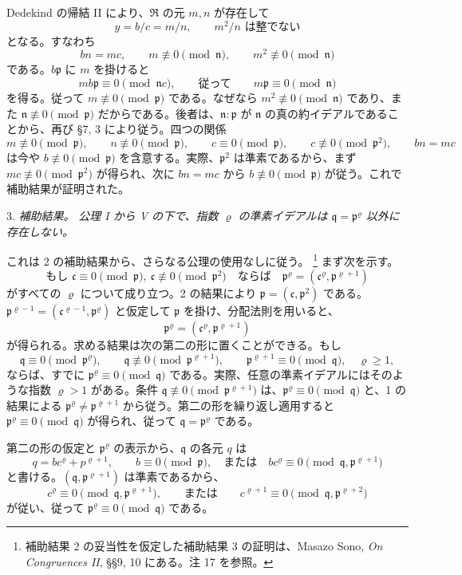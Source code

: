 \documentclass[11pt]{article}
\providecommand{\mR}{\mathfrak{R}}
\providecommand{\mc}{\mathfrak{c}}
\providecommand{\mn}{\mathfrak{n}}
\providecommand{\mpideal}{\mathfrak{p}}
\providecommand{\mq}{\mathfrak{q}}
\begin{document}
Dedekind の帰結 II により、$\mR$ の元 $m,n$ が存在して
\[
        y=b/c=m/n,
        \qquad m^2/n \text{ は整でない}
\]
となる。すなわち
\[
        bn=mc,
        \qquad m\not\equiv0\pmod{\mn},
        \qquad m^2\not\equiv0\pmod{\mn}
\]
である。$b\mpideal$ に $m$ を掛けると
\[
        mb\mpideal\equiv0\pmod{\mn c},
        \qquad\text{従って}\qquad m\mpideal\equiv0\pmod{\mn}
\]
を得る。従って $m\not\equiv0\pmod{\mpideal}$ である。なぜなら $m^2\not\equiv0\pmod{\mn}$ であり、また $\mn\not\equiv0\pmod{\mpideal}$ だからである。後者は、$\mn:\mpideal$ が $\mn$ の真の約イデアルであることから、再び §7, 3 により従う。四つの関係
\[
        m\not\equiv0\pmod{\mpideal},\qquad
        n\not\equiv0\pmod{\mpideal},\qquad
        c\equiv0\pmod{\mpideal},\qquad
        c\not\equiv0\pmod{\mpideal^2},\qquad
        bn=mc
\]
は今や $b\not\equiv0\pmod{\mpideal}$ を含意する。実際、$\mpideal^2$ は準素であるから、まず $mc\not\equiv0\pmod{\mpideal^2}$ が得られ、次に $bn=mc$ から $b\not\equiv0\pmod{\mpideal}$ が従う。これで補助結果が証明された。

3. \emph{補助結果。} \emph{公理 I から V の下で、指数 $\varrho$ の準素イデアルは $\mq=\mpideal^\varrho$ 以外に存在しない。}

これは 2 の補助結果から、さらなる公理の使用なしに従う。
\footnote{補助結果 2 の妥当性を仮定した補助結果 3 の証明は、Masazo Sono, \emph{On Congruences II}, §§9, 10 にある。注 17 を参照。}
まず次を示す。
\[
        \text{もし }\mc\equiv0\pmod{\mpideal},\ \mc\not\equiv0\pmod{\mpideal^2}
        \quad\text{ならば}\quad
        \mpideal^\varrho=(\mc^\varrho,\mpideal^{\varrho+1})
\]
がすべての $\varrho$ について成り立つ。2 の結果により $\mpideal=(\mc,\mpideal^2)$ である。$\mpideal^{\varrho-1}=(\mc^{\varrho-1},\mpideal^\varrho)$ と仮定して $\mpideal$ を掛け、分配法則を用いると、
\[
        \mpideal^\varrho=(\mc^\varrho,\mpideal^{\varrho+1})
\]
が得られる。求める結果は次の第二の形に置くことができる。もし
\[
        \mq\equiv0\pmod{\mpideal^\varrho},
        \qquad \mq\not\equiv0\pmod{\mpideal^{\varrho+1}},
        \qquad \mpideal^{\varrho+1}\equiv0\pmod{\mq},
        \quad \varrho\ge1,
\]
ならば、すでに $\mpideal^\varrho\equiv0\pmod{\mq}$ である。実際、任意の準素イデアルにはそのような指数 $\varrho>1$ がある。条件 $\mq\not\equiv0\pmod{\mpideal^{\varrho+1}}$ は、$\mpideal^\varrho\equiv0\pmod{\mq}$ と、1 の結果による $\mpideal^\varrho\ne\mpideal^{\varrho+1}$ から従う。第二の形を繰り返し適用すると $\mpideal^\varrho\equiv0\pmod{\mq}$ が得られ、従って $\mq=\mpideal^\varrho$ である。

第二の形の仮定と $\mpideal^\varrho$ の表示から、$\mq$ の各元 $q$ は
\[
        q=b c^\varrho+p^{\varrho+1},
        \qquad b\equiv0\pmod{\mpideal},
        \quad\text{または}\quad b c^\varrho\equiv0\pmod{\mq,\mpideal^{\varrho+1}}
\]
と書ける。$(\mq,\mpideal^{\varrho+1})$ は準素であるから、
\[
        c^\varrho\equiv0\pmod{\mq,\mpideal^{\varrho+1}},
        \qquad\text{または}\qquad
        c^{\varrho+1}\equiv0\pmod{\mq,\mpideal^{\varrho+2}}
\]
が従い、従って $\mpideal^\varrho\equiv0\pmod{\mq}$ である。
\end{document}
